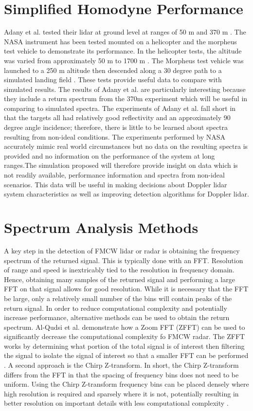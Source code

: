 \section{Simplified Homodyne Performance}
Adany et al.
tested their lidar at ground level at ranges of 50 m and 370 m \cite{adany09}.
The NASA instrument has been tested mounted on a helicopter and the morpheus
test vehicle to demonstrate its performance.
In the helicopter tests, the altitude was varied from approximately 50 m to 1700
m \cite{pierrottet2009flight,pierrottet2011navigation}.
The Morpheus test vehicle was launched to a 250 m altitude then descended
along a 30 degree path to a simulated landing field \cite{amz16coherent}.
These tests provide useful data to compare with simulated results.
The results of Adany et al.
are particularly interesting because they include a return spectrum from
the 370m experiment which will be useful in comparing to simulated spectra.
The experiments of Adany et al.
fall short in that the targets all had relatively good reflectivity and
an approximately 90 degree angle incidence; therefore, there is little to
be learned about spectra resulting from non-ideal conditions.
The experiments performed by NASA accurately mimic real world circumstances
but no data on the resulting spectra is provided and no information on
the performance of the system at long ranges.The simulation proposed will
therefore provide insight on data which is not readily available, performance
information and spectra from non-ideal scenarios.
This data will be useful in making decisions about Doppler lidar system
characteristics as well as improving detection algorithms for Doppler lidar.

\section{Spectrum Analysis Methods}
A key step in the detection of FMCW lidar or radar is obtaining the frequency spectrum 
of the returned signal. This is typically done with an FFT. Resolution of range and speed
is inextricably tied to the resolution in frequency domain. Hence, obtaining many samples
of the returned signal and performing a large FFT on that signal allows for good 
resolution. While it is necessary that the FFT be large, only a relatively small 
number of the bins will contain peaks of the return signal. In order to reduce computational
complexity and potentially increase performance, alternative methods can be used to obtain 
the return spectrum. Al-Qudsi et al. demonstrate 
how a Zoom FFT (ZFFT) can be used to significantly decrease the computational complexity
fo FMCW radar. The ZFFT works by determining what portion of the total signal
is of interest then filtering the signal to isolate the signal of interest so that a smaller
FFT can be performed \cite{Al-QudsiZoomfft}. A second approach is the Chirp Z-transform. In short, 
the Chirp Z-transform differs from the FFT in that the spacing of frequency bins does not need
to be uniform. Using the Chirp Z-transform frequency bins can be placed densely where high
resolution is required and sparsely where it is not, potentially resulting in better resolution
on important details with less computational complexity \cite{Pen-ChengChirpZ,wangThresh}. 

